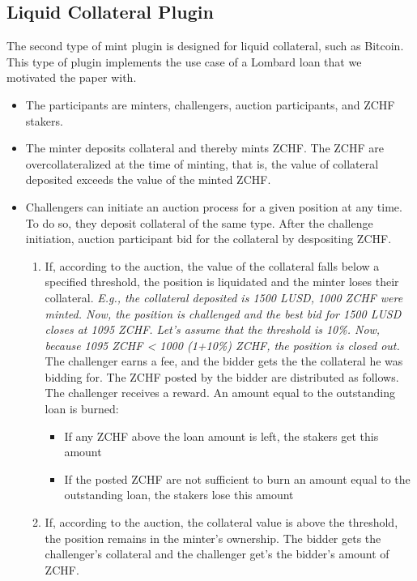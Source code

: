 \documentclass[english,11pt]{article}
\begin{document}
\subsection{Liquid Collateral Plugin}
The second type of mint plugin is designed for liquid collateral, such as
Bitcoin. This type of plugin implements the use case of a Lombard loan that
we motivated the paper with.

\begin{itemize}
\item The participants are minters, challengers, auction participants, and ZCHF stakers.
\item The minter deposits collateral and thereby mints ZCHF. The ZCHF are overcollateralized at the time
of minting, that is, the value of collateral deposited exceeds the value of the minted ZCHF.
\item Challengers can initiate an auction process for a given position at any time.
To do so, they deposit collateral of the same type. 
After the challenge initiation, auction participant bid for the collateral by despositing
ZCHF.
\begin{enumerate}
\item If, according to the auction, the value of the collateral falls below a specified threshold, the position is liquidated
and the minter loses their collateral. \emph{E.g., the collateral deposited is 1500 LUSD, 1000 ZCHF were minted. Now, the position
is challenged and the best bid for 1500 LUSD closes at 1095 ZCHF. Let's assume that the threshold is 10\%. Now, because 
1095 ZCHF < 1000 (1+10\%) ZCHF, the position is closed out.}
The challenger earns a fee, and the bidder gets the the collateral he was bidding for.
The ZCHF posted by the bidder are distributed as follows. The challenger
receives a reward. An amount equal to the outstanding loan is burned:
\begin{itemize}
\item If any ZCHF above the loan amount is left, the stakers get this amount
\item If the posted ZCHF are not sufficient to burn an amount equal to the outstanding loan,
the stakers lose this amount
\end{itemize}
\item If, according to the auction, the collateral value is above the threshold, the position remains in the minter's ownership. The bidder gets the challenger's collateral and
the challenger get's the bidder's amount of ZCHF.
\end{enumerate}
\end{itemize}
\end{document}

